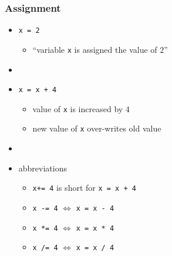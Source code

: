 \documentclass[14pt]{beamer}
\begin{document}
\begin{frame}[fragile]

\frametitle{Assignment}

\begin{itemize}
	\item \texttt{x = 2}
	\begin{itemize}
		\item ``variable \texttt{x} is assigned the value of $2$''
	\end{itemize}
	\item[]
	\item \texttt{x = x + 4}
	\begin{itemize}
		\item value of \texttt{x} is increased by $4$
		\item new value of \texttt{x} over-writes old value
	\end{itemize}
	\item[]
	\item abbreviations
		\begin{itemize}
		\item \texttt{x+= 4} is short for \texttt{x = x + 4}
		\item \texttt{x -= 4} $\Longleftrightarrow$  \texttt{x = x - 4}
		\item \texttt{x *= 4} $\Longleftrightarrow$ \texttt{x = x * 4}
		\item \texttt{x /= 4} $\Longleftrightarrow$ \texttt{x = x / 4}
	\end{itemize}

\end{itemize}

\end{frame}

\end{document}
